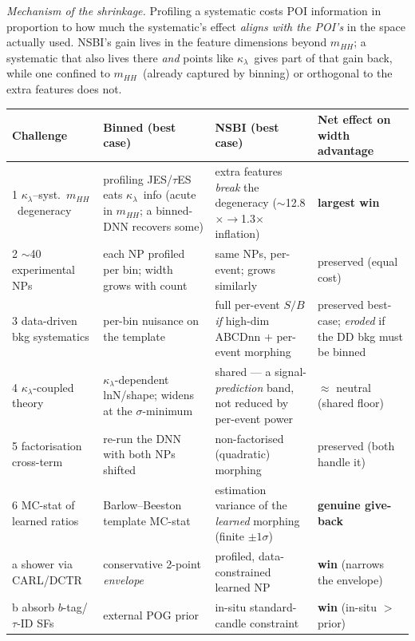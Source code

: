 \documentclass[11pt]{article}
\newcommand{\kl}{\ensuremath{\kappa_\lambda}}
\newcommand{\mhh}{\ensuremath{m_{HH}}}
\begin{document}
\smallskip\noindent\emph{Mechanism of the shrinkage.} Profiling a systematic costs POI information in proportion to
how much the systematic's effect \emph{aligns with the POI's} in the space actually used. NSBI's gain lives in the
feature dimensions beyond \mhh; a systematic that also lives there \emph{and} points like \kl\ gives part of that
gain back, while one confined to \mhh\ (already captured by binning) or orthogonal to the extra features does not.

\begin{table}[h]\centering\small
\begin{tabular}{@{}p{}p{}p{}p{}@{}}
\toprule
\textbf{Challenge} & \textbf{Binned (best case)} & \textbf{NSBI (best case)} & \textbf{Net effect on width advantage}\\
\midrule
1 \kl--syst.\ \mhh\ degeneracy & profiling JES/$\tau$ES eats \kl\ info (acute in \mhh; a binned-DNN recovers some) & extra features \emph{break} the degeneracy ($\sim$12.8$\times\!\to\!$1.3$\times$ inflation) & \textbf{largest win}\\
2 $\sim$40 experimental NPs & each NP profiled per bin; width grows with count & same NPs, per-event; grows similarly & preserved (equal cost)\\
3 data-driven bkg systematics & per-bin nuisance on the template & full per-event $S/B$ \emph{if} high-dim ABCDnn $+$ per-event morphing & preserved best-case; \emph{eroded} if the DD bkg must be binned\\
4 \kl-coupled theory & \kl-dependent lnN/shape; widens at the $\sigma$-minimum & shared --- a signal-\emph{prediction} band, not reduced by per-event power & $\approx$ neutral (shared floor)\\
5 factorisation cross-term & re-run the DNN with both NPs shifted & non-factorised (quadratic) morphing & preserved (both handle it)\\
6 MC-stat of learned ratios & Barlow--Beeston template MC-stat & estimation variance of the \emph{learned} morphing (finite $\pm1\sigma$) & \textbf{genuine give-back}\\
a shower via CARL/DCTR & conservative 2-point \emph{envelope} & profiled, data-constrained learned NP & \textbf{win} (narrows the envelope)\\
b absorb $b$-tag/$\tau$-ID SFs & external POG prior & in-situ standard-candle constraint & \textbf{win} (in-situ $>$ prior)\\
\bottomrule
\end{tabular}
\end{table}
\end{document}
